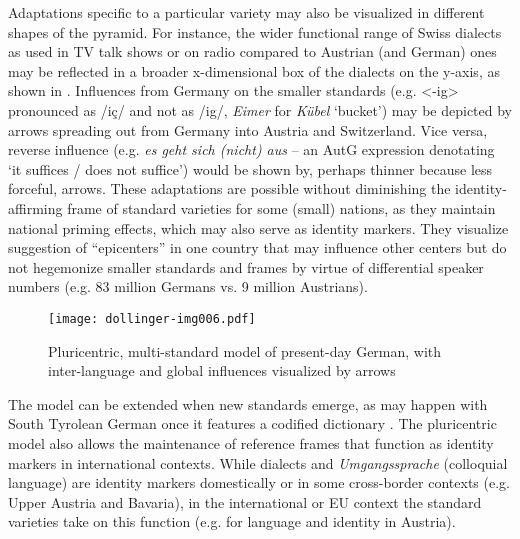 \documentclass[output=paper]{langscibook}
\begin{document}
Adaptations specific to a particular variety may also be visualized in different shapes of the pyramid. For instance, the wider functional range of Swiss dialects as used in TV talk shows or on radio compared to Austrian (and German) ones may be reflected in a broader x-dimensional box of the dialects on the y-axis, as shown in . Influences from Germany on the smaller standards (e.g. <-ig> pronounced as /iç/ and not as /ig/, \textit{Eimer} for \textit{Kübel} ‘bucket’) may be depicted by arrows spreading out from Germany into Austria and Switzerland. Vice versa, reverse influence (e.g. \textit{es geht sich (nicht) aus} – an AutG expression denotating ‘it suffices / does not suffice’) would be shown by, perhaps thinner because less forceful, arrows. These adaptations are possible without diminishing the identity-affirming frame of standard varieties for some (small) nations, as they maintain national priming effects, which may also serve as identity markers. They visualize  suggestion of “epicenters” in one country that may influence other centers but do not hegemonize smaller standards and frames by virtue of differential speaker numbers (e.g. 83 million Germans vs. 9 million Austrians).


\begin{figure}
\texttt{[image: dollinger-img006.pdf]}
\caption{Pluricentric, multi-standard model of present-day German, with inter-language and global influences visualized by arrows}
\label{fig:dollinger:4}
\end{figure}

The model can be extended when new standards emerge, as may happen with South Tyrolean German once it features a codified dictionary \citep{Hofer2020}. The pluricentric model also allows the maintenance of reference frames that function as identity markers in international contexts. While dialects and \textit{Umgangssprache} (colloquial language) are identity markers domestically or in some cross-border contexts (e.g. Upper Austria and Bavaria), in the international or EU context the standard varieties take on this function (e.g. \citealt{DeCilliaEtAl2020} for language and identity in Austria).
\end{document}
